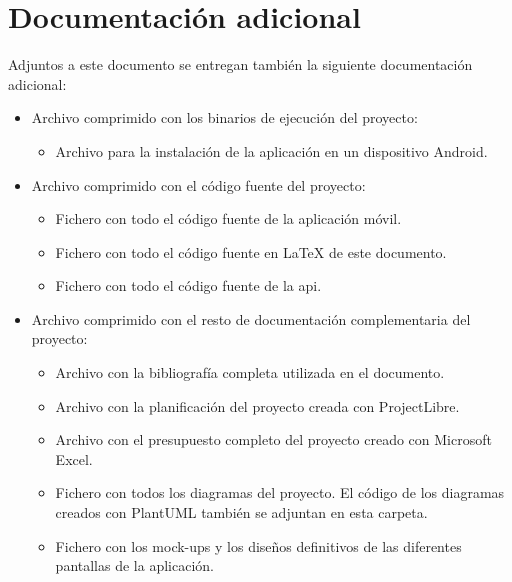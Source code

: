 \chapter{Documentación adicional}
\label{ch:documentacion_adicional}

Adjuntos a este documento se entregan también la siguiente documentación adicional:

\begin{itemize}
    \item Archivo comprimido  con los binarios de ejecución del proyecto:
    \begin{itemize}
        \item Archivo  para la instalación de la aplicación en un dispositivo Android.
    \end{itemize}
    \item Archivo comprimido  con el código fuente del proyecto:
    \begin{itemize}
        \item Fichero  con todo el código fuente de la aplicación móvil.
        \item Fichero  con todo el código fuente en LaTeX de este documento.
        \item Fichero  con todo el código fuente de la \acrshort{api}.
    \end{itemize}
    \item Archivo comprimido  con el resto de documentación complementaria del proyecto:
    \begin{itemize}
        \item Archivo  con la bibliografía completa utilizada en el documento.
        \item Archivo  con la planificación del proyecto creada con ProjectLibre.
        \item Archivo  con el presupuesto completo del proyecto creado con Microsoft Excel.
        \item Fichero  con todos los diagramas del proyecto. El código de los diagramas creados con PlantUML también se adjuntan en esta carpeta.
        \item Fichero  con los mock-ups y los diseños definitivos de las diferentes pantallas de la aplicación.
    \end{itemize}
\end{itemize}